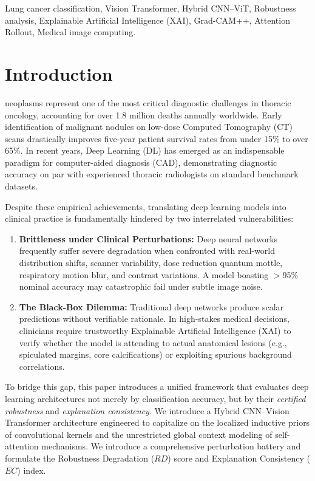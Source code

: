 \documentclass[journal]{IEEEtran}
\begin{document}
\begin{IEEEkeywords}
Lung cancer classification, Vision Transformer, Hybrid CNN--ViT, Robustness analysis, Explainable Artificial Intelligence (XAI), Grad-CAM++, Attention Rollout, Medical image computing.
\end{IEEEkeywords}

\section{Introduction}
 neoplasms represent one of the most critical diagnostic challenges in thoracic oncology, accounting for over 1.8 million deaths annually worldwide. Early identification of malignant nodules on low-dose Computed Tomography (CT) scans drastically improves five-year patient survival rates from under 15\% to over 65\%. In recent years, Deep Learning (DL) has emerged as an indispensable paradigm for computer-aided diagnosis (CAD), demonstrating diagnostic accuracy on par with experienced thoracic radiologists on standard benchmark datasets.

Despite these empirical achievements, translating deep learning models into clinical practice is fundamentally hindered by two interrelated vulnerabilities:
\begin{enumerate}
    \item \textbf{Brittleness under Clinical Perturbations:} Deep neural networks frequently suffer severe degradation when confronted with real-world distribution shifts, scanner variability, dose reduction quantum mottle, respiratory motion blur, and contrast variations. A model boasting $>$95\% nominal accuracy may catastrophic fail under subtle image noise.
    \item \textbf{The Black-Box Dilemma:} Traditional deep networks produce scalar predictions without verifiable rationale. In high-stakes medical decisions, clinicians require trustworthy Explainable Artificial Intelligence (XAI) to verify whether the model is attending to actual anatomical lesions (e.g., spiculated margins, core calcifications) or exploiting spurious background correlations.
\end{enumerate}

To bridge this gap, this paper introduces a unified framework that evaluates deep learning architectures not merely by classification accuracy, but by their \textit{certified robustness} and \textit{explanation consistency}. We introduce a Hybrid CNN--Vision Transformer architecture engineered to capitalize on the localized inductive priors of convolutional kernels and the unrestricted global context modeling of self-attention mechanisms. We introduce a comprehensive perturbation battery and formulate the Robustness Degradation ($RD$) score and Explanation Consistency ($EC$) index.
\end{document}
